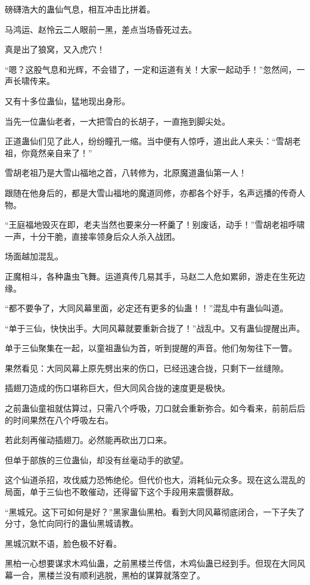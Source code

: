 \begin{this_body}
磅礴浩大的蛊仙气息，相互冲击比拼着。

马鸿运、赵怜云二人眼前一黑，差点当场昏死过去。

真是出了狼窝，又入虎穴！

“嗯？这股气息和光辉，不会错了，一定和运道有关！大家一起动手！”忽然间，一声长啸传来。

又有十多位蛊仙，猛地现出身形。

当先一位蛊仙老者，一大把雪白的长胡子，一直拖到脚尖处。

正道蛊仙们见了此人，纷纷瞳孔一缩。当中便有人惊呼，道出此人来头：“雪胡老祖，你竟然亲自来了！”

雪胡老祖乃是大雪山福地之首，八转修为，北原魔道蛊仙第一人！

跟随在他身后的，都是大雪山福地的魔道同修，亦都各个好手，名声远播的传奇人物。

“王庭福地毁灭在即，老夫当然也要来分一杯羹了！别废话，动手！”雪胡老祖呼啸一声，十分干脆，直接率领身后众人杀入战团。

场面越加混乱。

正魔相斗，各种蛊虫飞舞。运道真传几易其手，马赵二人危如累卵，游走在生死边缘。

“都不要争了，大同风幕里面，必定还有更多的仙蛊！！”混乱中有蛊仙叫道。

“单于三仙，快快出手。大同风幕就要重新合拢了！”战乱中。又有蛊仙提醒出声。

单于三仙聚集在一起，以童祖蛊仙为首，听到提醒的声音。他们匆匆往下一瞥。

果然看见：大同风幕上原先劈出来的伤口，已经迅速合拢，只剩下一丝缝隙。

插翅刀造成的伤口堪称巨大，但大同风合拢的速度更是极快。

之前蛊仙童祖就估算过，只需八个呼吸，刀口就会重新弥合。如今看来，前前后后的时间果然在八个呼吸左右。

若此刻再催动插翅刀。必然能再砍出刀口来。

但单于部族的三位蛊仙，却没有丝毫动手的欲望。

这个仙道杀招，攻伐威力恐怖绝伦。但代价也大，消耗仙元众多。现在这么混乱的局面，单于三仙也不敢催动，还得留下这个手段用来震慑群敌。

“黑城兄。这下可如何是好？”黑家蛊仙黑柏。看到大同风幕彻底闭合，一下子失了分寸，急忙向同行的蛊仙黑城请教。

黑城沉默不语，脸色极不好看。

黑柏一心想要谋求木鸡仙蛊，之前黑楼兰传信，木鸡仙蛊已经到手。但现在大同风幕一合，黑楼兰没有顺利逃脱，黑柏的谋算就落空了。


\end{this_body}
